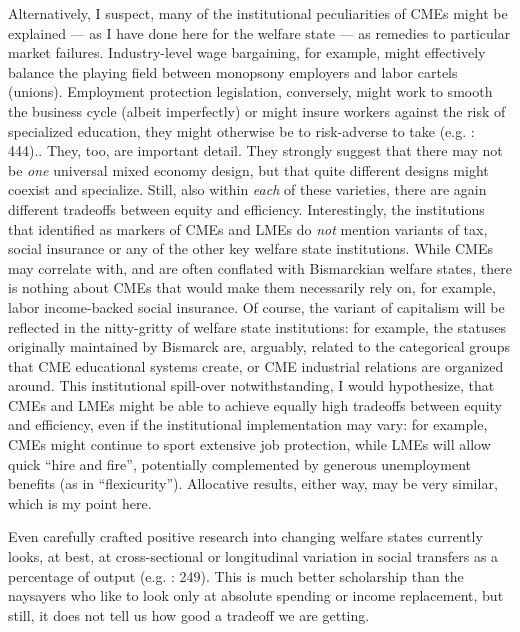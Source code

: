 \documentclass[11pt,a4paper,oneside,openright]{article}
\begin{document}
\begin{enumerate}
{		Alternatively, I suspect, many of the institutional peculiarities of \glspl{CME} might be explained --- as I have done here for the welfare state --- as remedies to particular market failures. Industry-level wage bargaining, for example, might effectively balance the playing field between monopsony employers and labor cartels (unions). Employment protection legislation, conversely, might work to smooth the business cycle (albeit imperfectly) or might insure workers against the risk of specialized education, they might otherwise be to risk-adverse to take (e.g. \citealt{Offe2003}: 444).}. 
	They, too, are important detail. They strongly suggest that there may not be \emph{one} universal mixed economy design, but that quite different designs might coexist and specialize. Still, also within \emph{each} of these varieties, there are again different tradeoffs between equity and efficiency. Interestingly, the institutions that \citeauthor{HallSoskice-2001-aa} identified as markers of \glspl{CME} and \glspl{LME} do \emph{not} mention variants of tax, social insurance or any of the other key welfare state institutions. While \glspl{CME} may correlate with, and are often conflated with Bismarckian welfare states, there is nothing about \glspl{CME} that would make them necessarily rely on, for example, labor income-backed social insurance. Of course, the variant of capitalism will be reflected in the nitty-gritty of welfare state institutions: for example, the statuses originally maintained by Bismarck are, arguably, related to the categorical groups that \gls{CME} educational systems create, or \gls{CME} industrial relations are organized around. This institutional spill-over notwithstanding, I would hypothesize, that \glspl{CME} and \glspl{LME} might be able to achieve equally high tradeoffs between equity and efficiency, even if the institutional implementation may vary: for example, \glspl{CME} might continue to sport extensive job protection, while \glspl{LME} will allow quick ``hire and fire'', potentially complemented by generous unemployment benefits (as in ``flexicurity''). Allocative results, either way, may be very similar, which is my point here.
	
	Even carefully crafted positive research into changing welfare states currently looks, at best, at cross-sectional or longitudinal variation in social transfers as a percentage of output (e.g. \citealt{Ravenhill2005}: 249). This is much better scholarship than the naysayers who like to look only at absolute spending or income replacement, but still, it does not tell us how good a tradeoff we are getting.
	

\end{enumerate}
\end{document}
